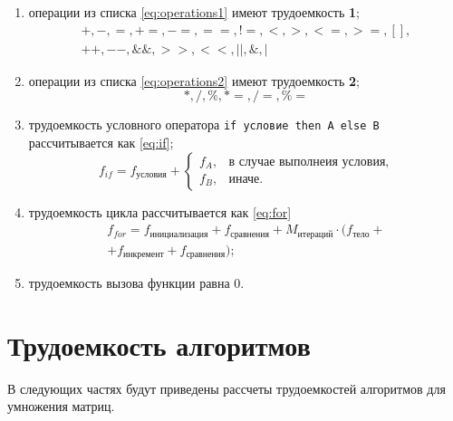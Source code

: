 \begin{enumerate}
	\item операции из списка \ref{eq:operations1} имеют трудоемкость \textbf{1};
	\begin{equation}
		\label{eq:operations1}
		\begin{gathered}
			+, -, =, +=, -=, ==, !=, <, >, <=, >=, [], \\ ++, --, \&\&, >>, <<, ||, \&, |
		\end{gathered}
	\end{equation}
	\item операции из списка \ref{eq:operations2} имеют трудоемкость \textbf{2};
	\begin{equation}
		\label{eq:operations2}
		*, /, \%, *=, /=, \%=
	\end{equation}
	\item трудоемкость условного оператора \texttt{if условие then A else B} рассчитывается как \ref{eq:if};
	\begin{equation}
		\label{eq:if}
		f_{if} = f_{\text{условия}} + 
		\begin{cases}
			f_{A}, & \text{в случае выполнеия условия,}\\
			f_{B}, & \text{иначе}.
		\end{cases}
	\end{equation}
	\item трудоемкость цикла рассчитывается как \ref{eq:for}
	\begin{equation}
		\label{eq:for}
		\begin{gathered}
			f_{for} = f_{\text{инициализация}} + f_{\text{сравнения}} + M_{\text{итераций}} \cdot (f_{\text{тело}} +\\
			+ f_{\text{инкремент}} + f_{\text{сравнения}});
		\end{gathered}
	\end{equation}
	\item трудоемкость вызова функции равна 0.
\end{enumerate}

\section{Трудоемкость алгоритмов}
В следующих частях будут приведены рассчеты трудоемкостей алгоритмов для умножения матриц.


